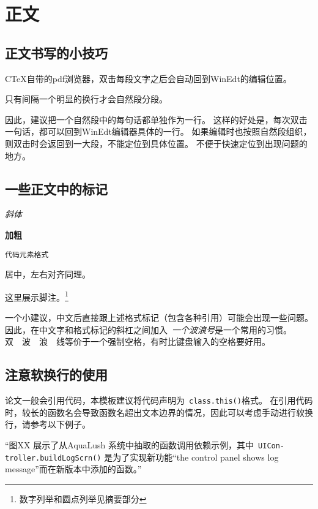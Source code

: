 \chapter{正文}

\section{正文书写的小技巧}
CTeX自带的pdf浏览器，双击每段文字之后会自动回到WinEdt的编辑位置。

只有间隔一个明显的换行才会自然段分段。

因此，建议把一个自然段中的每句话都单独作为一行。
这样的好处是，每次双击一句话，都可以回到WinEdt编辑器具体的一行。
如果编辑时也按照自然段组织，则双击时会返回到一大段，不能定位到具体位置。
不便于快速定位到出现问题的地方。

\section{一些正文中的标记}
\emph{斜体}

\textbf{加粗}

\texttt{代码元素格式}

\begin{center}
居中，左右对齐同理。
\end{center}

这里展示脚注。\footnote{数字列举和圆点列举见摘要部分}

一个小建议，中文后直接跟上述格式标记（包含各种引用）可能会出现一些问题。
因此，在中文字和格式标记的斜杠之间加入~\emph{一个波浪号}是一个常用的习惯。
双~~波~~浪~~线等价于一个强制空格，有时比键盘输入的空格要好用。


\section{注意软换行的使用}
论文一般会引用代码，本模板建议将代码声明为~\texttt{class.this()}格式。
在引用代码时，较长的函数名会导致函数名超出文本边界的情况，因此可以考虑手动进行软换行，请参考以下例子。

“图XX 展示了从AquaLush 系统中抽取的函数调用依赖示例，其中~\texttt{UICon-} \linebreak \texttt{troller.buildLogScrn()} 是为了实现新功能“the control panel shows log message”而在新版本中添加的函数。”
